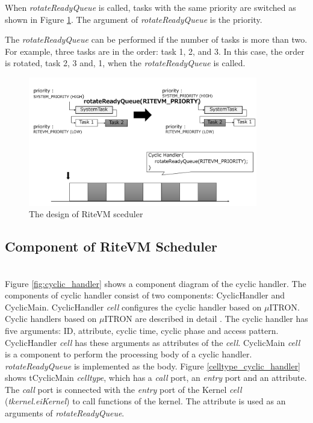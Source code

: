 \documentclass[a4j,12pt,oneside,openany,english]{jsbook}
\begin{document}
When {\it rotateReadyQueue} is called, tasks with the same priority are switched as shown in Figure \ref{fig:rotateReadyQueue}.
The argument of {\it rotateReadyQueue} is the priority.

The {\it rotateReadyQueue} can be performed if the number of tasks is more than two.
For example, three tasks are in the order: task 1, 2, and 3.
In this case, the order is rotated, task 2, 3 and, 1, when the {\it rotateReadyQueue} is called.

\begin{figure}[t]
    \centering
    \includegraphics[width=10cm,clip]{../EMSOFT2016/figure/rotateReadyQueue.pdf}
    \caption{The design of RiteVM sceduler}
    \label{fig:rotateReadyQueue}
\end{figure} 
 
\subsection{Component of RiteVM Scheduler} \mbox{}\\

Figure \ref{fig:cyclic_handler} shows a component diagram of the cyclic handler.
The components of cyclic handler consist of two components: CyclicHandler and CyclicMain.
CyclicHandler {\it cell} configures the cyclic handler based on $\mu$ITRON.
Cyclic handlers based on $\mu$ITRON are described in detail \cite{par:microITRON}.
The cyclic handler has five arguments: ID, attribute, cyclic time, cyclic phase and access pattern.
CyclicHandler {\it cell} has these arguments as attributes of the {\it cell}.
CyclicMain {\it cell} is a component to perform the processing body of a cyclic handler.
{\it rotateReadyQueue} is implemented as the body.
Figure \ref{celltype_cyclic_handler} shows tCyclicMain {\it celltype}, which has a {\it call} port, an {\it entry} port and an attribute.
The {\it call} port is connected with the {\it entry} port of the Kernel {\it cell} ({\it tkernel.eiKernel}) to call functions of the kernel. 
The attribute is used as an arguments of {\it rotateReadyQueue}.
\end{document}
